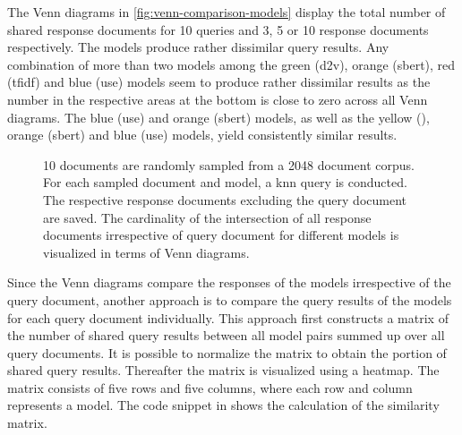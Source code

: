 The Venn diagrams in \autoref{fig:venn-comparison-models} display the total number of shared response documents for 10 queries 
and 3, 5 or 10 response documents respectively.
The models produce rather dissimilar query results.
Any combination of more than two models among the green (\ac{d2v}), orange (\ac{sbert}), red (\ac{tfidf}) and blue (\ac{use}) models 
seem to produce rather dissimilar results 
as the number in the respective areas at the bottom is close to zero across all Venn diagrams.
The blue (\ac{use}) and orange (\ac{sbert}) models, as well as the yellow (\infersent{}), orange (\ac{sbert}) and blue (\ac{use}) models, 
yield consistently similar results.

\begin{figure}%
    \centering
    \qquad
    \qquad
    \qquad   
    \caption[Venn diagram of query results]{
    10 documents are randomly sampled from a 2048 document corpus.
    For each sampled document and model, a \ac{knn} query is conducted.
    The respective response documents excluding the query document are saved.
    The cardinality of the intersection of all response documents irrespective of query document for different models is visualized in terms of Venn diagrams.}%
    \label{fig:venn-comparison-models}%
\end{figure}

Since the Venn diagrams compare the responses of the models irrespective of the query document, 
another approach is to compare the query results of the models for each query document individually.
This approach first constructs a matrix of the number of shared query results between all model pairs summed up over all query documents.
It is possible to normalize the matrix to obtain the portion of shared query results.
Thereafter the matrix is visualized using a heatmap.
The matrix consists of five rows and five columns, where each row and column represents a model.
The code snippet in  shows the calculation of the similarity matrix.

